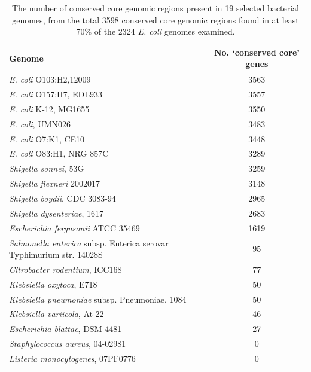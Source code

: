 \documentclass[doublespacing, linenumbers]{bmcart}
\begin{document}
\begin{backmatter}
\newpage
\begin{table}[h!]
\caption{The number of conserved core genomic regions present in 19 selected bacterial genomes, from the total 3598 conserved core genomic regions found in at least 70\% of the 2324 \textit{E. coli} genomes examined.}
\label{tab:specific_distribution}
      \begin{tabular}{lc}
        \hline
        Genome & No. `conserved core' genes\\ 
        \hline
        \textit{E. coli} O103:H2,12009 & 3563\\
        \textit{E. coli} O157:H7, EDL933 & 3557\\
        \textit{E. coli} K-12, MG1655 & 3550\\
        \textit{E. coli}, UMN026 & 3483\\
        \textit{E. coli} O7:K1, CE10 & 3448\\
        \textit{E. coli} O83:H1, NRG 857C & 3289\\
        \textit{Shigella sonnei}, 53G & 3259\\
        \textit{Shigella flexneri} 2002017 & 3148\\
        \textit{Shigella boydii}, CDC 3083-94 & 2965\\
        \textit{Shigella dysenteriae}, 1617 & 2683\\        
        \textit{Escherichia fergusonii} ATCC 35469  & 1619\\
        \textit{Salmonella enterica} subsp. Enterica serovar Typhimurium str. 14028S & 95\\
        \textit{Citrobacter rodentium}, ICC168 & 77\\
        \textit{Klebsiella oxytoca}, E718 & 50\\
        \textit{Klebsiella pneumoniae} subsp. Pneumoniae, 1084 & 50\\
        \textit{Klebsiella variicola}, At-22 & 46\\
        \textit{Escherichia blattae}, DSM 4481 & 27\\ 
        \textit{Staphylococcus aureus}, 04-02981 & 0\\
        \textit{Listeria monocytogenes}, 07PF0776 & 0\\
        \hline
      \end{tabular}
\end{table}


\end{backmatter}
\end{document}
